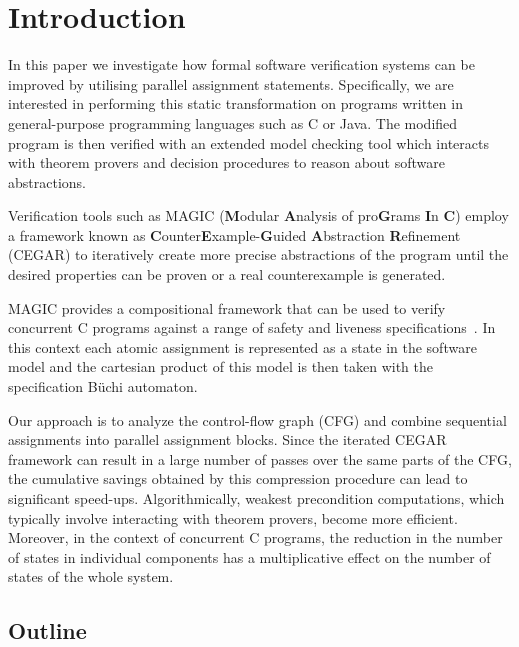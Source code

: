 

\section{Introduction}
\label{sec:intro}

In this paper we investigate how formal software verification systems
can be improved by utilising parallel assignment statements.
Specifically, we are interested in performing this static
transformation on programs written in general-purpose programming
languages such as C or Java.  The modified program is then verified
with an extended model checking tool which interacts with theorem
provers and decision procedures to reason about software abstractions.

Verification tools such as MAGIC (\textbf{M}odular \textbf{A}nalysis
of pro\textbf{G}rams \textbf{I}n \textbf{C})
\cite{website:magic,sagar:modularverification} employ a framework
known as \textbf{C}ounter\textbf{E}xample-\textbf{G}uided
\textbf{A}bstraction \textbf{R}efinement (CEGAR)
\cite{cegar,sagar:efficientverification} to iteratively create more
precise abstractions of the program until the desired properties can
be proven or a real counterexample is generated.

MAGIC provides a compositional framework that can be used to verify
concurrent C programs against a range of safety and liveness
specifications~\cite{sagar:efficientverification,IFM05,FACJ05}. In this
context each atomic assignment is represented as a state in the
software model and the cartesian product of this model is then taken with
the specification B\"uchi automaton.

Our approach is to analyze the control-flow graph (CFG) and combine
sequential assignments into parallel assignment blocks. Since the
iterated CEGAR framework can result in a large number of passes over
the same parts of the CFG, the cumulative savings obtained by this
compression procedure can lead to significant
speed-ups. Algorithmically, weakest precondition computations, which
typically involve interacting with theorem provers, become more
efficient. Moreover, in the context of concurrent C programs, the
reduction in the number of states in individual components has a
multiplicative effect on the number of states of the whole system.

\subsection{Outline}

